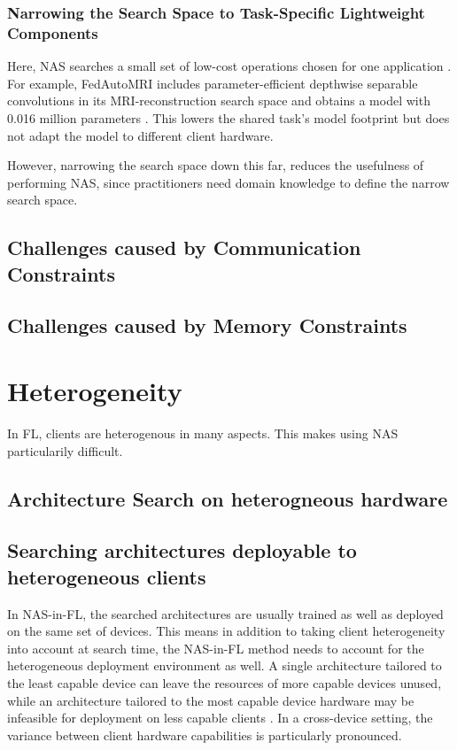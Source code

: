 \subsubsection{Narrowing the Search Space to Task-Specific Lightweight Components}

Here, NAS searches a small set of low-cost operations chosen for one application \cite{fed_auto_mri_2023,intrusion_detection_fednas_2024,cit2fr-fl-nas_2022}. For example, FedAutoMRI includes parameter-efficient depthwise separable convolutions in its MRI-reconstruction search space and obtains a model with 0.016 million parameters \cite{fed_auto_mri_2023}. This lowers the shared task's model footprint but does not adapt the model to different client hardware.

However, narrowing the search space down this far, reduces the usefulness of performing NAS, since practitioners need domain knowledge to define the narrow search space.

\subsection{Challenges caused by Communication Constraints}


\subsection{Challenges caused by Memory Constraints}

\section{Heterogeneity}

In FL, clients are heterogenous in many aspects. This makes using NAS particularily difficult.

\subsection{Architecture Search on heterogneous hardware}


\subsection{Searching architectures deployable to heterogeneous clients}

In NAS-in-FL, the searched architectures are usually trained as well as deployed on the same set of devices. This means in addition to taking client heterogeneity into account at search time, the NAS-in-FL method needs to account for the heterogeneous deployment environment as well. A single architecture tailored to the least capable device can leave the resources of more capable devices unused, while an architecture tailored to the most capable device hardware may be infeasible for deployment on less capable clients \cite{fedoras_2022}. In a cross-device setting, the variance between client hardware capabilities is particularly pronounced.


